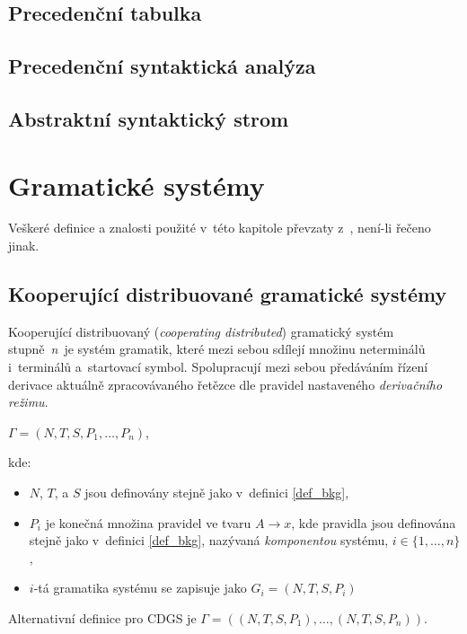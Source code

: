 \section{Precedenční tabulka}

\section{Precedenční syntaktická analýza}

\section{Abstraktní syntaktický strom}


\chapter{Gramatické systémy}\label{kap_GS}

Veškeré definice a znalosti použité v~této kapitole převzaty z~\cite{CDGS, PCGS, Handbook-Of-Formal-Languages-2}, není-li řečeno jinak.

\section{Kooperující distribuované gramatické systémy}\label{kap_CDGS}

Kooperující distribuovaný (\emph{cooperating distributed}) gramatický systém stupně~\emph{n}~je systém gramatik, které mezi sebou sdílejí množinu neterminálů i~terminálů a~startovací symbol.
Spolupracují mezi sebou předáváním řízení derivace aktuálně zpracovávaného řetězce dle pravidel nastaveného \emph{derivačního režimu}.

\begin{definition}\label{def_cdgs}
\begin{center}
    $\Gamma = (N, T, S, P_1, \ldots ,P_n)$,
\end{center}
kde:
\begin{itemize}
    \item $N$, $T$, a $S$ jsou definovány stejně jako v~definici \ref{def_bkg},
    \item $P_i$ je konečná množina pravidel ve tvaru $A\rightarrow x$, kde pravidla jsou definována stejně jako v~definici \ref{def_bkg}, nazývaná \emph{komponentou} systému, $i \in \{1, \ldots, n\}$,
    \item $i$-tá gramatika systému se zapisuje jako $G_i = (N,T,S,P_i)$
\end{itemize}   
Alternativní definice pro CDGS je $\Gamma = ((N, T, S, P_1), \ldots , (N, T, S, P_n))$.
\end{definition}


